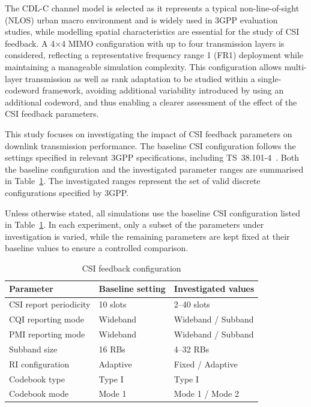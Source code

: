 \documentclass[a4paper,12pt,onecolumn]{article}
\begin{document}
	The CDL-C channel model is selected as it represents a typical non-line-of-sight (NLOS) urban macro environment and is widely used in 3GPP evaluation studies, while modelling spatial characteristics are essential for the study of CSI feedback. A 4$\times$4 MIMO configuration with up to four transmission layers is considered, reflecting a representative frequency range 1 (FR1) deployment while maintaining a manageable simulation complexity. This configuration allows multi-layer transmission as well as rank adaptation to be studied within a single-codeword framework, avoiding additional variability introduced by using an additional codeword, and thus enabling a clearer assessment of the effect of the CSI feedback parameters.
	
	
	This study focuses on investigating the impact of CSI feedback parameters on downlink transmission performance. The baseline CSI configuration follows the settings specified in relevant 3GPP specifications, including TS~38.101-4~\cite{3gpp_ts_38101_4}. Both the baseline configuration and the investigated parameter ranges are summarised in Table~\ref{tab:csi_config}. The investigated ranges represent the set of valid discrete configurations specified by 3GPP.
	
	Unless otherwise stated, all simulations use the baseline CSI configuration listed in Table~\ref{tab:csi_config}. In each experiment, only a subset of the parameters under investigation is varied, while the remaining parameters are kept fixed at their baseline values to ensure a controlled comparison.
	
	\begin{table}[h]
		\centering
		\caption{CSI feedback configuration}
		\label{tab:csi_config}
		\begin{tabular}{lll}
			\hline
			\textbf{Parameter} & \textbf{Baseline setting} & \textbf{Investigated values} \\
			\hline
			CSI report periodicity      & 10 slots & 2–40 slots \\
			CQI reporting mode          & Wideband & Wideband / Subband \\
			PMI reporting mode          & Wideband & Wideband / Subband \\
			Subband size                & 16 RBs   & 4–32 RBs \\
			RI configuration            & Adaptive & Fixed / Adaptive \\
			Codebook type               & Type I   & Type I \\
			Codebook mode               & Mode 1   & Mode 1 / Mode 2 \\
			\hline
		\end{tabular}
	\end{table}
	\vspace{-0.8cm}
\end{document}
